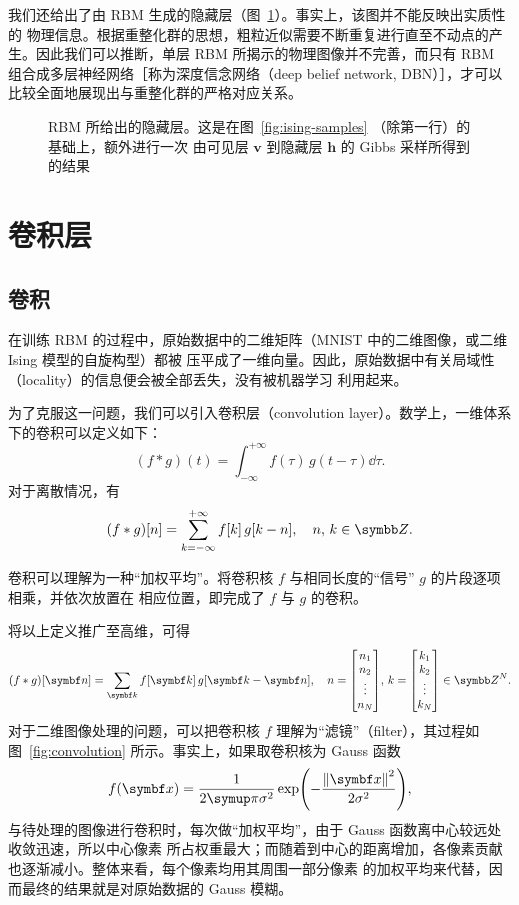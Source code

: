 我们还给出了由 RBM 生成的隐藏层（图~\ref{fig:ising-hidden}）。事实上，该图并不能反映出实质性的
物理信息。根据重整化群的思想，粗粒近似需要不断重复进行直至不动点的产生。因此我们可以推断，单层 RBM
所揭示的物理图像并不完善，而只有 RBM 组合成多层神经网络［称为深度信念网络（deep belief network,
DBN）］，才可以比较全面地展现出与重整化群的严格对应关系。

\begin{figure}[htb]
  \centering
  \caption{RBM 所给出的隐藏层。这是在图~\ref{fig:ising-samples} （除第一行）的基础上，额外进行一次
    由可见层 $\bm{v}$ 到隐藏层 $\bm{h}$ 的 Gibbs 采样所得到的结果}
  \label{fig:ising-hidden}
\end{figure}

\section{卷积层}

\subsection{卷积}

在训练 RBM 的过程中，原始数据中的二维矩阵（MNIST 中的二维图像，或二维 Ising 模型的自旋构型）都被
压平成了一维向量。因此，原始数据中有关局域性（locality）的信息便会被全部丢失，没有被机器学习
利用起来。

为了克服这一问题，我们可以引入卷积层（convolution layer）。数学上，一维体系下的卷积可以定义如下：
\begin{equation}
  \label{eq:convolution-continuous}
  (f \ast g) (t) = \int_{-\infty}^{+\infty} f(\tau) \, g(t-\tau) \dd{\tau}.
\end{equation}
对于离散情况，有
\begin{equation}
  (f \ast g) [n] = \sum_{k=-\infty}^{+\infty} f[k] \, g[k-n] \qc n,\,k \in \Z.
\end{equation}

卷积可以理解为一种“加权平均”。将卷积核 $f$ 与相同长度的“信号” $g$ 的片段逐项相乘，并依次放置在
相应位置，即完成了 $f$ 与 $g$ 的卷积。

将以上定义推广至高维，可得
\begin{equation}
  (f \ast g) [\bm{n}] = \sum_{\bm{k}} f[\bm{k}] \, g[\bm{k}-\bm{n}] \qc
  n=\mqty[n_1 \\ n_2 \\ \vdots \\ n_N], \, k=\mqty[k_1 \\ k_2 \\ \vdots \\ k_N] \in \Z^N.
\end{equation}
对于二维图像处理的问题，可以把卷积核 $f$ 理解为“滤镜”（filter），其过程如图~\ref{fig:convolution}
所示。事实上，如果取卷积核为 Gauss 函数
\begin{equation}
  f(\bm{x}) = \frac{1}{2\pp\sigma^2} \exp(-\frac{\norm{\bm{x}}^2}{2\sigma^2}),
\end{equation}
与待处理的图像进行卷积时，每次做“加权平均”，由于 Gauss 函数离中心较远处收敛迅速，所以中心像素
所占权重最大；而随着到中心的距离增加，各像素贡献也逐渐减小。整体来看，每个像素均用其周围一部分像素
的加权平均来代替，因而最终的结果就是对原始数据的 Gauss 模糊。

